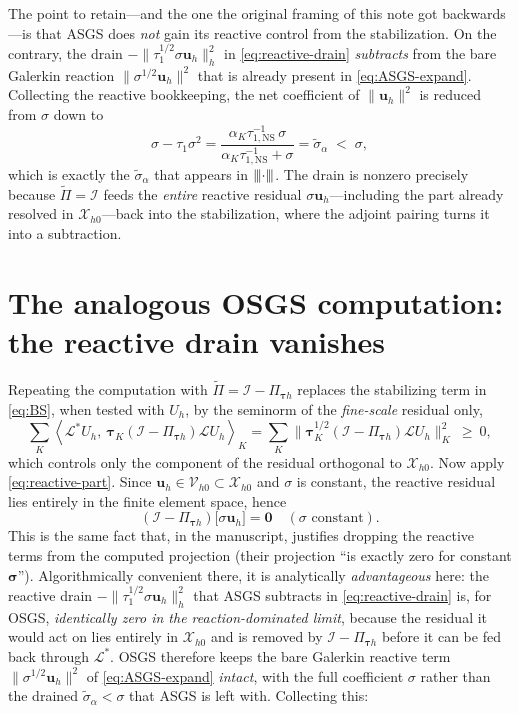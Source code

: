 \documentclass[11pt]{article}
\newcommand{\triplenorm}[1]{{\lvert\kern-0.25ex\lvert\kern-0.25ex\lvert #1
\rvert\kern-0.25ex\rvert\kern-0.25ex\rvert}}
\newcommand{\dualpairing}[1]{\left\langle #1\right\rangle}
\theoremstyle{plain}
\theoremstyle{remark}
\newcommand{\uh}{\boldsymbol{u}_h}
\newcommand{\Uh}{U_h}
\newcommand{\Xh}{\mathcal{X}_{h0}}
\newcommand{\Pio}{\Pi_{\boldsymbol{\tau}h}}            %
\newcommand{\Porth}{\widetilde{\Pi}}                  %
\newcommand{\siga}{\widetilde{\sigma}_\alpha}
\newcommand{\tauNS}{\tau_{1,\mathrm{NS}}}
\begin{document}
%
The point to retain---and the one the original framing of this note got
backwards---is that ASGS does \emph{not} gain its reactive control from the
stabilization. On the contrary, the drain $-\|\tau_1^{1/2}\sigma\uh\|_h^2$ in
\cref{eq:reactive-drain} \emph{subtracts} from the bare Galerkin reaction
$\|\sigma^{1/2}\uh\|^2$ that is already present in \cref{eq:ASGS-expand}. Collecting
the reactive bookkeeping, the net coefficient of $\|\uh\|^2$ is reduced from
$\sigma$ down to
\begin{equation}\label{eq:siga-as-net}
  \sigma-\tau_1\sigma^2
  = \frac{\alpha_K\tauNS^{-1}\,\sigma}{\alpha_K\tauNS^{-1}+\sigma}
  = \siga \;<\;\sigma ,
\end{equation}
which is exactly the $\siga$ that appears in $\triplenorm{\cdot}$. The drain is
nonzero precisely because $\Porth=\mathcal{I}$ feeds the \emph{entire} reactive
residual $\sigma\uh$---including the part already resolved in $\Xh$---back into the
stabilization, where the adjoint pairing turns it into a subtraction.

\section{The analogous OSGS computation: the reactive drain vanishes}
Repeating the computation with $\Porth=\mathcal{I}-\Pio$ replaces the stabilizing
term in \cref{eq:BS}, when tested with $\Uh$, by the seminorm of the
\emph{fine-scale} residual only,
%
\begin{equation}\label{eq:OSGS-stab}
  \sum_K\dualpairing{\mathcal{L}^*\Uh,\ \boldsymbol{\tau}_K(\mathcal{I}-\Pio)\mathcal{L}\Uh}_K
  = \sum_K\big\|\boldsymbol{\tau}_K^{1/2}(\mathcal{I}-\Pio)\mathcal{L}\Uh\big\|_K^2 \ \ge\ 0 ,
\end{equation}
%
which controls only the component of the residual orthogonal to $\Xh$. Now apply
\cref{eq:reactive-part}. Since $\uh\in\mathcal{V}_{h0}\subset\Xh$ and $\sigma$ is
constant, the reactive residual lies entirely in the finite element space, hence
%
\begin{equation}\label{eq:annihilation}
  \boxed{\;(\mathcal{I}-\Pio)\big[\sigma\uh\big]=\boldsymbol{0}\quad(\sigma\text{ constant}).\;}
\end{equation}
%
This is the same fact that, in the manuscript, justifies dropping the reactive
terms from the computed projection (their projection ``is exactly zero for
constant $\boldsymbol{\sigma}$''). Algorithmically convenient there, it is
analytically \emph{advantageous} here: the reactive drain
$-\|\tau_1^{1/2}\sigma\uh\|_h^2$ that ASGS subtracts in \cref{eq:reactive-drain}
is, for OSGS, \emph{identically zero in the reaction-dominated limit}, because the
residual it would act on lies entirely in $\Xh$ and is removed by
$\mathcal{I}-\Pio$ before it can be fed back through $\mathcal{L}^*$. OSGS therefore
keeps the bare Galerkin reactive term $\|\sigma^{1/2}\uh\|^2$ of
\cref{eq:ASGS-expand} \emph{intact}, with the full coefficient $\sigma$ rather than
the drained $\siga<\sigma$ that ASGS is left with. Collecting this:
\end{document}
